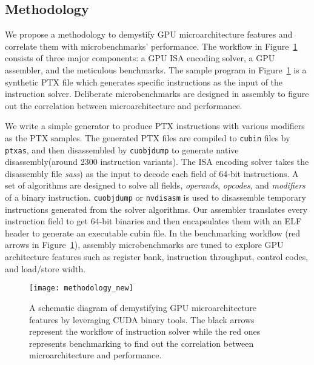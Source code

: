 \subsection{Methodology}


We propose a methodology to demystify GPU microarchitecture features and correlate them with microbenchmarks' performance.
The workflow in Figure~\ref{fig:workflow} consists of three major components: a GPU ISA encoding solver, a GPU assembler, and the meticulous benchmarks.
The sample program in Figure~\ref{fig:workflow} is a synthetic PTX file which generates specific instructions as the input of the instruction solver.
Deliberate microbenchmarks are designed in assembly to figure out the correlation between microarchitecture and performance.

We write a simple generator to produce PTX instructions with various modifiers as the PTX samples.
The generated PTX files are compiled to {\tt cubin} files by {\tt ptxas}, and
then disassembled by {\tt cuobjdump} to generate native disassembly(around 2300 instruction variants). 
The ISA encoding solver takes the disassembly file {\em sass}) as the input to decode each field of 64-bit instructions.
A set of algorithms are designed to solve all fields, {\em operands}, {\em opcodes}, and {\em modifiers} of a binary instruction.
{\tt cuobjdump} or {\tt nvdisasm} is used to disassemble temporary instructions generated from the solver algorithms.
Our assembler translates every instruction field to get 64-bit binaries and then encapsulates them with an ELF header to generate an executable cubin file.
In the benchmarking workflow (red arrows in Figure~\ref{fig:workflow}), assembly microbenchmarks are tuned to explore GPU architecture features such as register bank, instruction throughput, control codes, and load/store width.


\begin{figure}[htbp]
\begin{center}
    \texttt{[image: methodology\_new]}
\caption{A schematic diagram of demystifying GPU microarchitecture features by leveraging CUDA binary tools. The black arrows
    represent the workflow of instruction solver while the red ones represents benchmarking to find out the correlation between microarchitecture and performance.}
\label{fig:workflow}
\end{center}
\end{figure}
